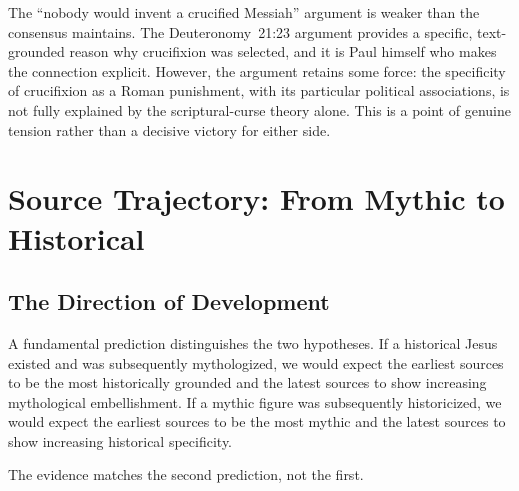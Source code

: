 \documentclass[12pt,oneside]{article}
\begin{document}
The ``nobody would invent a crucified Messiah'' argument is weaker than
the consensus maintains.  The Deuteronomy~21:23 argument provides a
specific, text-grounded reason why crucifixion was selected, and it is
Paul himself who makes the connection explicit.  However, the argument
retains some force: the specificity of crucifixion as a Roman punishment,
with its particular political associations, is not fully explained by
the scriptural-curse theory alone.  This is a point of genuine tension
rather than a decisive victory for either side.


\section{Source Trajectory: From Mythic to Historical}
\label{sec:trajectory}

\subsection{The Direction of Development}
\label{sec:trajectory:direction}

A fundamental prediction distinguishes the two hypotheses.  If a
historical Jesus existed and was subsequently mythologized, we would
expect the earliest sources to be the most historically grounded and
the latest sources to show increasing mythological embellishment.  If
a mythic figure was subsequently historicized, we would expect the
earliest sources to be the most mythic and the latest sources to show
increasing historical specificity.

The evidence matches the second prediction, not the first.
\end{document}
